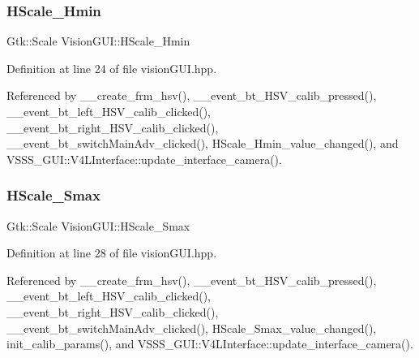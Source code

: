 \mbox{\label{class_vision_g_u_i_a8cc0de8ce9ca9c05d1c47176b724ecc3}} 
\subsubsection{\texorpdfstring{H\+Scale\+\_\+\+Hmin}{HScale\_Hmin}}
{\footnotesize\ttfamily Gtk\+::\+Scale Vision\+G\+U\+I\+::\+H\+Scale\+\_\+\+Hmin}



Definition at line 24 of file vision\+G\+U\+I.\+hpp.



Referenced by \+\_\+\+\_\+create\+\_\+frm\+\_\+hsv(), \+\_\+\+\_\+event\+\_\+bt\+\_\+\+H\+S\+V\+\_\+calib\+\_\+pressed(), \+\_\+\+\_\+event\+\_\+bt\+\_\+left\+\_\+\+H\+S\+V\+\_\+calib\+\_\+clicked(), \+\_\+\+\_\+event\+\_\+bt\+\_\+right\+\_\+\+H\+S\+V\+\_\+calib\+\_\+clicked(), \+\_\+\+\_\+event\+\_\+bt\+\_\+switch\+Main\+Adv\+\_\+clicked(), H\+Scale\+\_\+\+Hmin\+\_\+value\+\_\+changed(), and V\+S\+S\+S\+\_\+\+G\+U\+I\+::\+V4\+L\+Interface\+::update\+\_\+interface\+\_\+camera().

\mbox{\label{class_vision_g_u_i_a147e8499bd7412fdb732103c0754f013}} 
\subsubsection{\texorpdfstring{H\+Scale\+\_\+\+Smax}{HScale\_Smax}}
{\footnotesize\ttfamily Gtk\+::\+Scale Vision\+G\+U\+I\+::\+H\+Scale\+\_\+\+Smax}



Definition at line 28 of file vision\+G\+U\+I.\+hpp.



Referenced by \+\_\+\+\_\+create\+\_\+frm\+\_\+hsv(), \+\_\+\+\_\+event\+\_\+bt\+\_\+\+H\+S\+V\+\_\+calib\+\_\+pressed(), \+\_\+\+\_\+event\+\_\+bt\+\_\+left\+\_\+\+H\+S\+V\+\_\+calib\+\_\+clicked(), \+\_\+\+\_\+event\+\_\+bt\+\_\+right\+\_\+\+H\+S\+V\+\_\+calib\+\_\+clicked(), \+\_\+\+\_\+event\+\_\+bt\+\_\+switch\+Main\+Adv\+\_\+clicked(), H\+Scale\+\_\+\+Smax\+\_\+value\+\_\+changed(), init\+\_\+calib\+\_\+params(), and V\+S\+S\+S\+\_\+\+G\+U\+I\+::\+V4\+L\+Interface\+::update\+\_\+interface\+\_\+camera().

